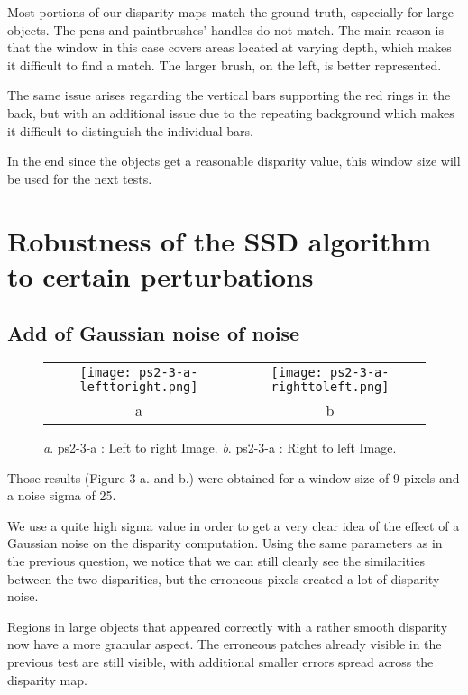 \documentclass[a4paper,11pt]{article}
\begin{document}
Most portions of our disparity maps match the ground truth, especially for large objects. The pens and paintbrushes' handles do not match. The main reason is that the window in this case covers areas located at varying depth, which makes it difficult to find a match. The larger brush, on the left, is better represented.

The same issue arises regarding the vertical bars supporting the red rings in the back, but with an additional issue due to the repeating background which makes it difficult to distinguish the individual bars.

In the end since the objects get a reasonable disparity value, this window size will be used for the next tests.

\section{Robustness of the SSD algorithm to certain perturbations}

\subsection{Add of Gaussian noise of noise}


 \begin{figure}[H]
\begin{center}
\begin{tabular}{cc}
	\texttt{[image: ps2-3-a-lefttoright.png]}&
	\texttt{[image: ps2-3-a-righttoleft.png]}\\
	a&b
\end{tabular}
\end{center}
\caption{ 
\textit{a}. ps2-3-a : Left to right Image.  \textit{b}. ps2-3-a : Right to left Image. }
\label{ps2-1}
\end{figure}

Those results (Figure 3 a. and b.) were obtained for a window size of 9 pixels and a noise sigma of 25.

We use a quite high sigma value in order to get a very clear idea of the effect of a Gaussian noise on the disparity computation.
Using the same parameters as in the previous question, we notice that we can still clearly see the similarities between the two disparities, but the erroneous pixels created a lot of disparity noise.

Regions in large objects that appeared correctly with a rather smooth disparity now have a more granular aspect. The erroneous patches already visible in the previous test are still visible, with additional smaller errors spread across the disparity map.
\end{document}
